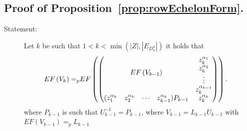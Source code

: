 \documentclass[11pt]{llncs}
\begin{document}
\subsection{Proof of Proposition~\ref{prop:rowEchelonForm}.}
\begin{description}
    \item[Statement:] Let $k$ be such that $1<k< \min{\left(|Z|,|E_{D_n^n}|\right)}$ it holds that
    \begin{align*}
        EF\left(V_{k}\right) =_p & EF
        \begin{pmatrix}
        \begin{pmatrix}
            \multicolumn{4}{c}{\multirow{4}{*}{$EF\left(V_{k-1}\right)$}} & z_k^{\alpha_1}\\
            & & & & z_k^{\alpha_2}\\
            & & & & \vdots\\
            & & & & z_{k}^{\alpha_{k-1}}\\
            (z_1^{\alpha_{k}} & z_2^{\alpha_{k}}& \cdots & z_{k-1}^{\alpha_{k}})P_{k-1} & z_{k}^{\alpha_k}
        \end{pmatrix}
        \end{pmatrix}.
    \end{align*}
    where $P_{k-1}$ is such that $U_{k-1}^{-1} = P_{k-1}$, where $V_{k-1} = L_{k-1}U_{k-1}$ with $EF(V_{k-1})=_p L_{k-1}$
\end{description}
\end{document}
